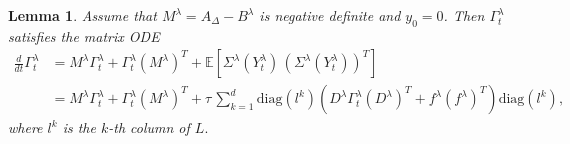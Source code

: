 \documentclass[10pt,a4paper]{amsart}
\newtheorem{lemma}{Lemma}
\begin{document}
\begin{lemma}
    Assume that $M^\lambda = A_\Delta -B^\lambda$ is negative definite and $y_0 = 0$. Then $ \Gamma_t^\lambda$ satisfies the matrix ODE
    \begin{equation*}
            \begin{split}
                 \frac{d}{dt} \Gamma_t^\lambda &= M^\lambda \Gamma_t^\lambda + \Gamma_t^\lambda (M^\lambda)^T
+ \mathbb{E}\!\left[\Sigma^\lambda(Y_t^\lambda)\,(\Sigma^\lambda(Y_t^\lambda))^T\right]\\
                 & = M ^\lambda \Gamma_t^\lambda + \Gamma_t^\lambda (M^\lambda)^T + \tau \, \sum_{k=1}^d \mathrm{diag}(l^k) (D^\lambda \Gamma_t^\lambda (D^\lambda)^T + f^\lambda (f^\lambda)^T) \mathrm{diag} (l^k),
            \end{split}
        \end{equation*}
        where $l^k$ is the $k$-th column of $L.$
\end{lemma}
\end{document}
